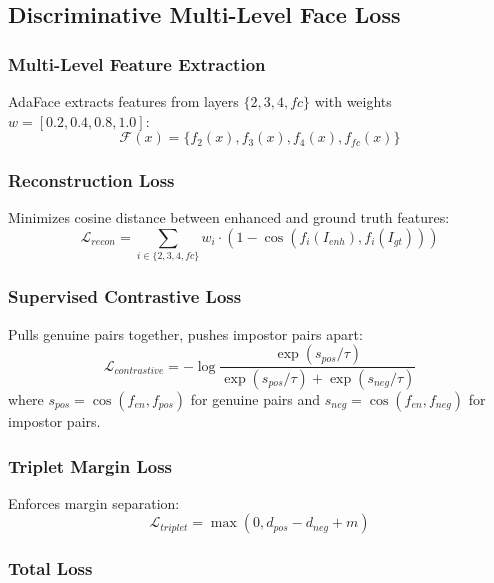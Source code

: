 \documentclass[12pt,a4paper]{article}
\begin{document}
\subsection{Discriminative Multi-Level Face Loss}

\subsubsection{Multi-Level Feature Extraction}

AdaFace extracts features from layers $\{2, 3, 4, fc\}$ with weights $w = [0.2, 0.4, 0.8, 1.0]$:
\begin{equation}
\mathcal{F}(x) = \{f_2(x), f_3(x), f_4(x), f_{fc}(x)\}
\end{equation}

\subsubsection{Reconstruction Loss}

Minimizes cosine distance between enhanced and ground truth features:
\begin{equation}
\mathcal{L}_{recon} = \sum_{i \in \{2,3,4,fc\}} w_i \cdot (1 - \cos(f_i(I_{enh}), f_i(I_{gt})))
\end{equation}

\subsubsection{Supervised Contrastive Loss}

Pulls genuine pairs together, pushes impostor pairs apart:
\begin{equation}
\mathcal{L}_{contrastive} = -\log \frac{\exp(s_{pos}/\tau)}{\exp(s_{pos}/\tau) + \exp(s_{neg}/\tau)}
\end{equation}
where $s_{pos} = \cos(f_{en}, f_{pos})$ for genuine pairs and $s_{neg} = \cos(f_{en}, f_{neg})$ for impostor pairs.

\subsubsection{Triplet Margin Loss}

Enforces margin separation:
\begin{equation}
\mathcal{L}_{triplet} = \max(0, d_{pos} - d_{neg} + m)
\end{equation}

\subsubsection{Total Loss}
\end{document}
